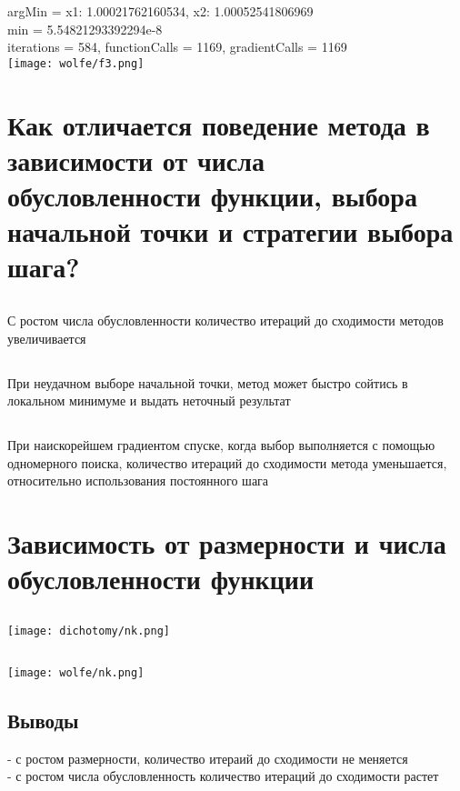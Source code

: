 \documentclass{article}
\begin{document}
argMin = {x1: 1.00021762160534, x2: 1.00052541806969} \\
min =  5.54821293392294e-8 \\
iterations =  584, functionCalls =  1169, gradientCalls =  1169 \\

\texttt{[image: wolfe/f3.png]} \\

\section{Как отличается поведение метода в зависимости от числа обусловленности функции, выбора начальной точки и стратегии выбора шага?}

\subsection{}
С ростом числа обусловленности количество итераций до сходимости методов увеличивается

\subsection{}
При неудачном выборе начальной точки, метод может быстро сойтись в локальном минимуме и выдать неточный результат

\subsection{}
При наискорейшем градиентом спуске, когда выбор выполняется с помощью одномерного поиска, количество итераций до сходимости метода уменьшается, относительно использования постоянного шага

\section{Зависимость от размерности и числа обусловленности функции}

\subsection{}
\texttt{[image: dichotomy/nk.png]} \\

\subsection{}
\texttt{[image: wolfe/nk.png]} \\

\subsection{Выводы}
- с ростом размерности, количество итераий до сходимости не меняется \\
- с ростом числа обусловленность количество итераций до сходимости растет
\end{document}
